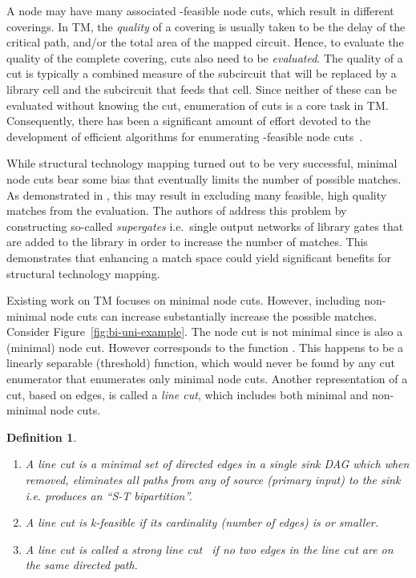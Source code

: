 \documentclass[journal]{IEEEtran}
\newtheorem{definition}{Definition}
\begin{document}
A node may have many associated -feasible node cuts, which result in different coverings.  In TM, the \emph{quality} of a covering is usually  taken to be the  delay of the critical path, and/or the total area of the mapped circuit.  Hence, to evaluate the quality of the complete covering, cuts also need to be \emph{evaluated}. The quality of a cut is typically a combined measure of the subcircuit that will be replaced by a library cell and the subcircuit that feeds that cell. Since neither of these can be evaluated without knowing the cut, enumeration of cuts is a core task in TM.  Consequently, there has been a significant amount of effort devoted to the development of efficient algorithms for enumerating -feasible node cuts~\cite{Chatterjee2006,Cong1994,Ling2007,Pan1998}.

While structural technology mapping turned out to be very successful, minimal node cuts bear some bias that eventually limits the number of possible matches. As demonstrated in \cite{Mishchenko_technologymapping}, this may result in excluding many feasible, high quality matches from the evaluation. The authors of \cite{Mishchenko_technologymapping} address this problem by constructing so-called \emph{supergates} i.e.\ single output networks of library gates that are added to the library in order to increase the number of matches. This demonstrates that enhancing a match space could yield significant benefits for structural technology mapping.

Existing work on TM focuses on minimal node cuts. However, including non-minimal node cuts can increase substantially increase the possible matches.  Consider Figure~\ref{fig:bi-uni-example}.  The node cut  is not minimal since  is also a (minimal) node cut.  However  corresponds to the function .  This happens to be a linearly separable (threshold) function, which would never be found by any cut enumerator that enumerates only minimal node cuts. Another representation of a cut, based on edges, is called a \textit{line cut}, which includes both minimal and non-minimal node cuts. 

\begin{definition}
\begin{enumerate}
\item[(a)] A line cut is a \textit{minimal} set of directed edges in a single sink DAG which when removed, eliminates all paths from any of source (primary input) to the sink i.e. produces an ``S-T bipartition''.   
\item[(b)] A line cut is \textit{k-feasible} if its cardinality (number of edges) is  or smaller.
\item[(c)] A line cut is called a \textit{strong} line cut~\cite{kagaris1999maximum}  if no two edges in the line cut are on the same directed path. 
\end{enumerate}
\end{definition}
\end{document}
